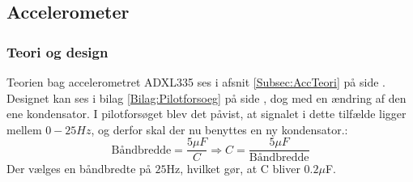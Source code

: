 \subsection{Accelerometer}
\subsubsection{Teori og design}
Teorien bag accelerometret ADXL335 ses i afsnit \ref{Subsec:AccTeori} på side \pageref{Subsec:AccTeori}. Designet kan ses i bilag \ref{Bilag:Pilotforsoeg} på side \pageref{Bilag:Pilotforsoeg}, dog med en ændring af den ene kondensator. I pilotforsøget blev det påvist, at signalet i dette tilfælde ligger mellem $0-25Hz$, og derfor skal der nu benyttes en ny kondensator.\cite{Devices2009}:
\begin{equation}
\text{Båndbredde} = \dfrac{5\mu F}{C} \Rightarrow  C = \dfrac{5\mu F}{\text{Båndbredde}}
\end{equation}
Der vælges en båndbredte på $25$Hz, hvilket gør, at C bliver $0.2\mu$F.  

